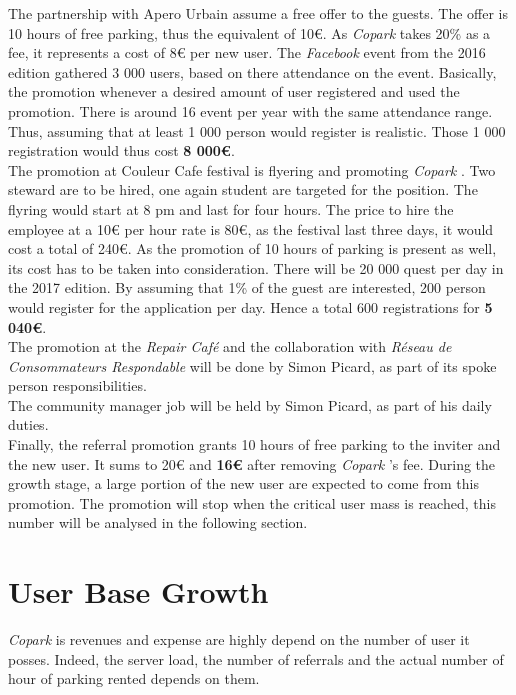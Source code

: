 \documentclass[12pt,a4paper,oneside]{book}
\newcommand{\bp}{\textit{Copark }}
\begin{document}
The partnership with Apero Urbain assume a free offer to the guests. The offer is 10 hours of free parking, thus the equivalent of 10\euro{}. As \bp takes 20\% as a fee, it represents a cost of 8\euro{} per new user. The \textit{Facebook} event from the 2016 edition gathered 3 000 users, based on there attendance on the event.\cite{fbau} Basically, the promotion whenever a desired amount of user registered and used the promotion. There is around 16 event per year with the same attendance range. Thus, assuming that at least 1 000 person would register is realistic. Those 1 000 registration would thus cost \textbf{8 000\euro{}}.\\


The promotion at Couleur Cafe festival is flyering and promoting \bp. Two steward are to be hired, one again student are targeted for the position. The flyring would start at 8 pm and last for four hours. The price to hire the employee at a 10\euro{} per hour rate is 80\euro{}, as the festival last three days, it would cost a total of 240\euro{}. As the promotion of 10 hours of parking is present as well, its cost has to be taken into consideration. There will be 20 000 quest per day in the 2017 edition. By assuming that 1\% of the guest are interested, 200 person would register for the application per day. Hence a total 600 registrations for \textbf{5 040\euro{}}.\\

The promotion at the \textit{Repair Café} and the collaboration with \textit{Réseau de Consommateurs Respondable} will be done by Simon Picard, as part of its spoke person responsibilities.\\

The community manager job will be held by Simon Picard, as part of his daily duties.\\

Finally, the referral promotion grants 10 hours of free parking to the inviter and the new user. It sums to 20\euro{} and \textbf{16\euro{}} after removing \bp's fee. During the growth stage, a large portion of the new user are expected to come from this promotion. The promotion will stop when the critical user mass is reached, this number will be analysed in the following section.

\section{User Base Growth}
\bp is revenues and expense are highly depend on the number of user it posses. Indeed, the server load, the number of referrals and the actual number of hour of parking rented depends on them.
\end{document}
